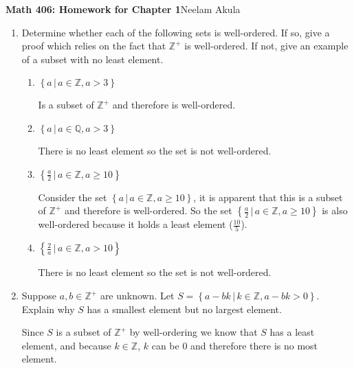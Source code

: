 \documentclass{article}
\def\integers{{\mathbb Z}}
\def\rationals{{\mathbb Q}}
\begin{document}
\pagestyle{empty}

\noindent\textbf{Math 406: Homework for Chapter 1}\hfill Neelam Akula

\begin{enumerate}

\item
  Determine whether each of the following sets is well-ordered.  If
  so, give a proof which relies on the fact that $\integers^+$ is well-ordered.
  If not, give an example of a subset with no least element.
  \begin{enumerate}
  \item
    $\left\{a\,\big|\, a\in\integers,a>3\right\}$

    Is a subset of $\integers^+$ and therefore is well-ordered.
  \item
    $\left\{a\,\big|\, a\in\rationals,a>3\right\}$

    There is no least element so the set is not well-ordered.
  \item
    $\left\{\frac a2\,\big|\, a\in\integers,a\geq 10\right\}$

    Consider the set $\left\{a\,\big|\, a\in\integers,a\geq 10\right\}$, it is apparent that this is a subset of $\integers^+$ and therefore is well-ordered.
    So the set $\left\{\frac a2\,\big|\, a\in\integers,a\geq 10\right\}$ is also well-ordered because it holds a least element ($\frac{10}{5}$).
  \item
    $\left\{\frac 2a\,\big|\, a\in\integers,a>10\right\}$

    There is no least element so the set is not well-ordered.
  \end{enumerate}

\item
  Suppose $a,b\in\integers^+$ are unknown.  Let
  $S=\left\{a-bk\,\big|\, k\in\integers,a-bk>0\right\}$.
  Explain why $S$ has a smallest element but no largest element.

  Since $S$ is a subset of $\integers^+$ by well-ordering we know that $S$ has a least element, and because $k\in\integers$,
  $k$ can be $0$ and therefore there is no most element.


\end{enumerate}
\end{document}
